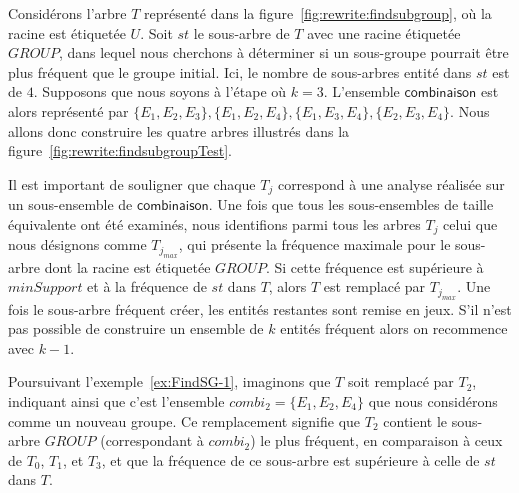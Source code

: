 \begin{example}
    \label{ex:FindSG-1}
    Considérons l'arbre $T$ représenté dans la figure~\ref{fig:rewrite:findsubgroup}, où la racine est étiquetée $U$.
    Soit $st$ le sous-arbre de $T$ avec une racine étiquetée $GROUP$, dans lequel nous cherchons à déterminer si un sous-groupe pourrait être plus fréquent que le groupe initial.
    Ici, le nombre de sous-arbres entité dans $st$ est de $4$.
    Supposons que nous soyons à l'étape où $k=3$.
    L'ensemble $\textsf{combinaison}$ est alors représenté par ${\{E_1, E_2, E_3\}, \{E_1, E_2, E_4\}, \{E_1, E_3, E_4\}, \{E_2, E_3, E_4\}}$.
    Nous allons donc construire les quatre arbres illustrés dans la figure~\ref{fig:rewrite:findsubgroupTest}.
\end{example}

Il est important de souligner que chaque $T_j$ correspond à une analyse réalisée sur un sous-ensemble de $\textsf{combinaison}$.
Une fois que tous les sous-ensembles de taille équivalente ont été examinés, nous identifions parmi tous les arbres $T_j$ celui que nous désignons comme $T_{j_{max}}$, qui présente la fréquence maximale pour le sous-arbre dont la racine est étiquetée $GROUP$.
Si cette fréquence est supérieure à $minSupport$ et à la fréquence de $st$ dans $T$, alors $T$ est remplacé par $T_{j_{max}}$.
Une fois le sous-arbre fréquent créer, les entités restantes sont remise en jeux.
S'il n'est pas possible de construire un ensemble de $k$ entités fréquent alors on recommence avec $k-1$.

\begin{example}
    Poursuivant l'exemple~\ref{ex:FindSG-1}, imaginons que $T$ soit remplacé par $T_2$, indiquant ainsi que c'est l'ensemble $combi_2 = \{E_1, E_2, E_4\}$ que nous considérons comme un nouveau groupe.
    Ce remplacement signifie que $T_2$ contient le sous-arbre $GROUP$ (correspondant à $combi_2$) le plus fréquent, en comparaison à ceux de $T_0$, $T_1$, et $T_3$, et que la fréquence de ce sous-arbre est supérieure à celle de $st$ dans $T$.
\end{example}

